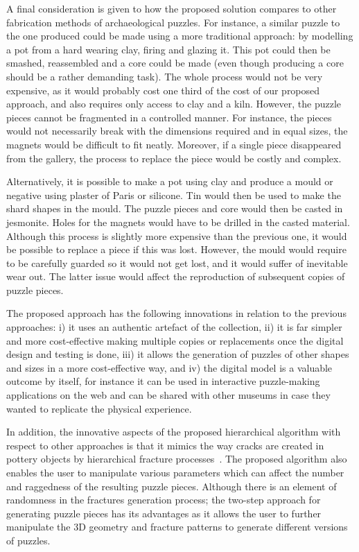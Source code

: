 \documentclass[acmlarge,screen,dvipsnames]{acmart}
\begin{document}

A final consideration is given to how the proposed solution compares
to other fabrication methods of archaeological puzzles. For instance,
a similar puzzle to the one produced could be made using a more
traditional approach: by modelling a pot from a hard wearing clay,
firing and glazing it. This pot could then be smashed, reassembled and
a core could be made (even though producing a core should be a rather
demanding task). The whole process would not be very expensive, as it
would probably cost one third of the cost of our proposed approach,
and also requires only access to clay and a kiln. However, the puzzle
pieces cannot be fragmented in a controlled manner. For instance, the
pieces would not necessarily break with the dimensions required and in
equal sizes, the magnets would be difficult to fit neatly. Moreover, 
if a single piece disappeared from the gallery, the
process to replace the piece would be costly and complex.

Alternatively, it is possible to make a pot using clay and produce a
mould or negative using plaster of Paris or silicone. Tin would then
be used to make the shard shapes in the mould. The puzzle pieces and
core would then be casted in jesmonite. Holes for the magnets would
have to be drilled in the casted material. Although this process is
slightly more expensive than the previous one, it would be possible to
replace a piece if this was lost. However, the mould would require to
be carefully guarded so it would not get lost, and it would suffer of
inevitable wear out. The latter issue would affect the reproduction of
subsequent copies of puzzle pieces.

The proposed approach has the following innovations in relation to the
previous approaches: i) it uses an authentic artefact of the
collection, ii) it is far simpler and more cost-effective making
multiple copies or replacements once the digital design and testing is
done, iii) it allows the generation of puzzles of other shapes and
sizes in a more cost-effective way, and iv) the digital model is a
valuable outcome by itself, for instance it can be used in interactive
puzzle-making applications on the web and can be shared with other
museums in case they wanted to replicate the physical experience.

In addition, the innovative aspects of the proposed hierarchical algorithm 
with respect to other approaches is that it mimics the way cracks 
are created in pottery objects
by hierarchical fracture processes~\cite{Shin:2012:ASF:2362402.2362404}. 
The proposed algorithm also enables the user to manipulate various parameters 
which can affect the number and raggedness of the resulting puzzle pieces.
Although there is an element of randomness in the fractures generation 
process; the two-step approach for generating puzzle pieces has its
advantages as it allows the user to further manipulate the 3D geometry and 
fracture patterns to generate different versions of puzzles. 
\end{document}
